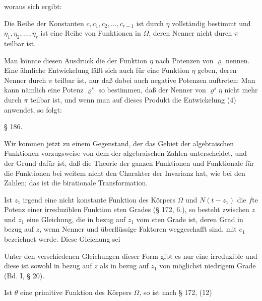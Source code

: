 

woraus sich ergibt:


Die Reihe der Konstanten $c, c_1, c_2, \ldots, c_{r-1}$ ist durch
$\eta$ vollständig bestimmt und $\eta_1, \eta_2, \ldots, \eta_r$ ist
eine Reihe von Funktionen in $\Omega$, deren Nenner nicht durch $\pi$
teilbar ist.

Man könnte diesen Ausdruck die  der Funktion
$\eta$ nach Potenzen von $\varrho$ nennen. Eine ähnliche Entwickelung
läßt sich auch für eine Funktion $\eta$ geben, deren Nenner durch
$\pi$ teilbar ist, nur daß dabei auch negative Potenzen auftreten:
Man kann nämlich eine Potenz $\varrho^s$ so bestimmen, daß der Nenner
von $\varrho^s\eta$ nicht mehr durch $\pi$ teilbar ist, und wenn man
auf dieses Produkt die Entwickelung (4) anwendet, so folgt:


\begin{center}
§ 186. \textbf{}
\end{center}

Wir kommen jetzt zu einem Gegenstand, der das Gebiet der
algebraischen Funktionen vorzugsweise von dem der algebraischen
Zahlen unterscheidet, und der Grund dafür ist, daß die Theorie der
ganzen Funktionen und Funktionale für die Funktionen bei weitem
nicht den Charakter der Invarianz hat, wie bei den Zahlen; das ist
die birationale Transformation.

Ist $z_1$ irgend eine nicht konstante Funktion des Körpers $\Omega$
und $N(t - z_1)$ die $f$te Potenz einer irreduziblen Funktion $e$ten
Grades (§ 172, 6.), so besteht zwischen $z$ und $z_1$ eine Gleichung,
die in bezug auf $z_1$ vom $e$ten Grade ist, deren Grad in bezug auf
$z$, wenn Nenner und überflüssige Faktoren weggeschafft sind, mit
$e_1$ bezeichnet werde. Diese Gleichung sei


Unter den verschiedenen Gleichungen dieser Form gibt es nur eine
irreduzible und diese ist sowohl in bezug auf $z$ als in bezug auf
$z_1$ von möglichst niedrigem Grade (Bd. I, § 20).

Ist $\theta$ eine primitive Funktion des Körpers $\Omega$, so ist
nach § 172, (12)

